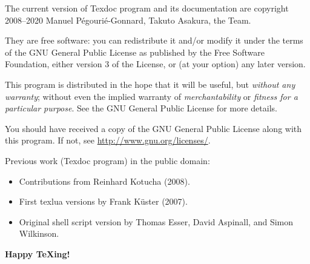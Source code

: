 \documentclass{texdoc-doc}
\begin{document}
The current version of Texdoc program and its documentation are copyright
2008--2020 Manuel Pégourié-Gonnard, Takuto Asakura, the {\TL} Team.

They are free software: you can redistribute it and/or modify it under the
terms of the GNU General Public License as published by the Free Software
Foundation, either version 3 of the License, or (at your option) any later
version.

This program is distributed in the hope that it will be useful, but
\emph{without any warranty}; without even the implied warranty of
\emph{merchantability} or \emph{fitness for a particular purpose}. See the
GNU General Public License for more details.

You should have received a copy of the GNU General Public License along with
this program. If not, see \url{http://www.gnu.org/licenses/}.

\bigskip

Previous work (Texdoc program) in the public domain:
%
\begin{itemize}
\item Contributions from Reinhard Kotucha (2008).
\item First texlua versions by Frank K\"uster (2007).
\item Original shell script version by Thomas Esser, David Aspinall, and Simon
  Wilkinson.
\end{itemize}

\bigskip

\begin{center}
\Large\bfseries
Happy {\TeX}ing!
\end{center}
\end{document}
